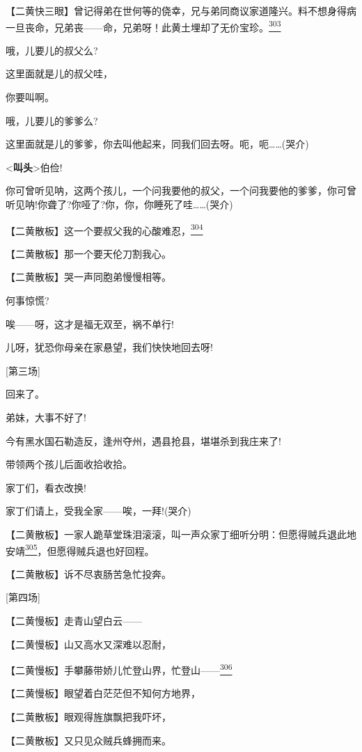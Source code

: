 【二黄快三眼】曾记得弟在世何等的侥幸，兄与弟同商议家道隆兴。料不想身得病一旦丧命，兄弟丧------命，兄弟呀！此黄土埋却了无价宝珍。\protect\hyperlink{fn303}{\textsuperscript{303}}

哦，儿要儿的叔父么?

这里面就是儿的叔父哇，

你要叫啊。

哦，儿要儿的爹爹么?

这里面就是儿的爹爹，你去叫他起来，同我们回去呀。呃，呃\ldots{}\ldots{}(哭介)

\textless{}\textbf{叫头}\textgreater{}伯俭!

你可曾听见呐，这两个孩儿，一个问我要他的叔父，一个问我要他的爹爹，你可曾听见呐!你聋了?你哑了?你，你，你睡死了哇\ldots{}\ldots{}(哭介)

【二黄散板】这一个要叔父我的心酸难忍，\protect\hyperlink{fn304}{\textsuperscript{304}}

【二黄散板】那一个要天伦刀割我心。

【二黄散板】哭一声同胞弟慢慢相等。

何事惊慌?

唉------呀，这才是福无双至，祸不单行!

儿呀，犹恐你母亲在家悬望，我们快快地回去呀!

{[}第三场{]}

回来了。

弟妹，大事不好了!

今有黑水国石勒造反，逢州夺州，遇县抢县，堪堪杀到我庄来了!

带领两个孩儿后面收拾收拾。

家丁们，看衣改换!

家丁们请上，受我全家------唉，一拜!(哭介)

【二黄散板】一家人跪草堂珠泪滚滚，叫一声众家丁细听分明：但愿得贼兵退此地安靖\protect\hyperlink{fn305}{\textsuperscript{305}}，但愿得贼兵退也好回程。

【二黄散板】诉不尽衷肠苦急忙投奔。

{[}第四场{]}

【二黄慢板】走青山望白云------

【二黄慢板】山又高水又深难以忍耐，

【二黄慢板】手攀藤带娇儿忙登山界，忙登山------\protect\hyperlink{fn306}{\textsuperscript{306}}

【二黄慢板】眼望着白茫茫但不知何方地界，

【二黄散板】眼观得旌旗飘把我吓坏，

【二黄散板】又只见众贼兵蜂拥而来。

